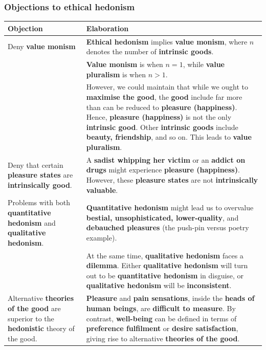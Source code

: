 \documentclass[11pt]{article}
\begin{document}
 \newpage
\subsubsection{Objections to ethical hedonism}
\label{sec:org529c392}
\begin{center}
\begin{tabular}{|m{10em}|m{25em}|}
\hline
Objection & Elaboration\\
\hline
Deny \textbf{value monism} & \textbf{Ethical hedonism} implies \textbf{value monism}, where \(n\) denotes the number of \textbf{intrinsic goods}.\\
 & \textbf{Value monism} is when \(n = 1\), while \textbf{value pluralism} is when \(n > 1\).\\
 & However, we could maintain that while we ought to \textbf{maximise the good}, the \textbf{good} include far more than can be reduced to \textbf{pleasure (happiness)}. Hence, \textbf{pleasure (happiness)} is not the only \textbf{intrinsic good}. Other \textbf{intrinsic goods} include \textbf{beauty, friendship}, and so on. This leads to \textbf{value pluralism}.\\
\hline
Deny that certain \textbf{pleasure states} are \textbf{intrinsically good}. & A \textbf{sadist whipping her victim} or an \textbf{addict on drugs} might experience \textbf{pleasure (happiness)}. However, these \textbf{pleasure states} are not \textbf{intrinsically valuable}.\\
Problems with both \textbf{quantitative hedonism} and \textbf{qualitative hedonism}. & \textbf{Quantitative hedonism} might lead us to overvalue \textbf{bestial, unsophisticated, lower-quality}, and \textbf{debauched pleasures} (the push-pin versus poetry example).\\
 & At the same time, \textbf{qualitative hedonism} faces a \textbf{dilemma}. Either \textbf{qualitative hedonism} will turn out to be \textbf{quantitative hedonism} in disguise, or \textbf{qualitative hedonism} will be \textbf{inconsistent}.\\
\hline
Alternative \textbf{theories of the good} are superior to the \textbf{hedonistic} theory of the good. & \textbf{Pleasure} and \textbf{pain sensations}, inside the \textbf{heads of human beings}, are \textbf{difficult to measure}. By contrast, \textbf{well-being} can be defined in terms of \textbf{preference fulfilment} or \textbf{desire satisfaction}, giving rise to alternative \textbf{theories of the good}.\\
\hline
\end{tabular}
\end{center}
\end{document}
